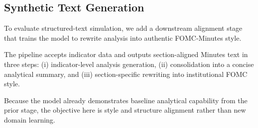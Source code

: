 \subsection*{Synthetic Text Generation}

To evaluate structured-text simulation, we add a downstream alignment stage that trains the model to rewrite analysis into authentic FOMC-Minutes style.






The pipeline accepts indicator data and outputs section-aligned Minutes text in three steps: (i) indicator-level analysis generation, (ii) consolidation into a concise analytical summary, and (iii) section-specific rewriting into institutional FOMC style.


Because the model already demonstrates baseline analytical capability from the prior stage, the objective here is style and structure alignment rather than new domain learning.



